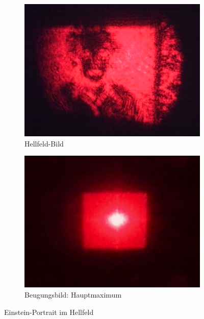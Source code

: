 \begin{figure}[p]
	\centering
	\begin{subfigure}{0.49\textwidth}
		\includegraphics[width=\textwidth]{data/optics/06_Einstein_Hell_Bild}
		\caption{Hellfeld-Bild}				\label{fig:Einstein_hell_B}
	\end{subfigure}
	\begin{subfigure}{0.49\textwidth}
		\includegraphics[width=\textwidth]{data/optics/06_Einstein_Hell_Beugung}
		\caption{Beugungsbild: Hauptmaximum}	\label{fig:Einstein_hell_BG}
	\end{subfigure}
	\caption{Einstein-Portrait im Hellfeld}		\label{fig:Einstein_hell}
	\vspace{-1em}
\end{figure}

